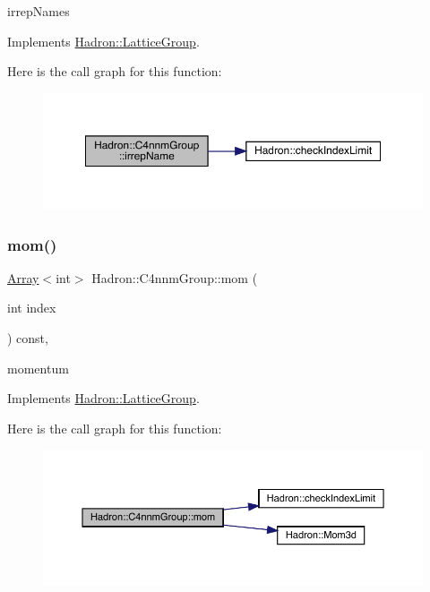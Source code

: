 irrep\+Names 

Implements \mbox{\hyperlink{structHadron_1_1LatticeGroup_a4bc5620218c2a73157e19bc4451fe746}{Hadron\+::\+Lattice\+Group}}.

Here is the call graph for this function\+:
\nopagebreak
\begin{figure}[H]
\begin{center}
\leavevmode
\includegraphics[width=350pt]{d1/dba/structHadron_1_1C4nnmGroup_ac2b3ee6989ddbd93bc63c46ac9626997_cgraph}
\end{center}
\end{figure}
\mbox{\label{structHadron_1_1C4nnmGroup_a7553c7f91a8dc310b37b7b5da32e98f6}} 
\subsubsection{\texorpdfstring{mom()}{mom()}\hspace{0.1cm}{\footnotesize\ttfamily [1/2]}}
{\footnotesize\ttfamily \mbox{\hyperlink{classXMLArray_1_1Array}{Array}}$<$int$>$ Hadron\+::\+C4nnm\+Group\+::mom (\begin{DoxyParamCaption}\item[{int}]{index }\end{DoxyParamCaption}) const\hspace{0.3cm}{\ttfamily [inline]}, {\ttfamily [virtual]}}

momentum 

Implements \mbox{\hyperlink{structHadron_1_1LatticeGroup_ad577b65041dd9a6e84b1f3bd49cb8fce}{Hadron\+::\+Lattice\+Group}}.

Here is the call graph for this function\+:
\nopagebreak
\begin{figure}[H]
\begin{center}
\leavevmode
\includegraphics[width=350pt]{d1/dba/structHadron_1_1C4nnmGroup_a7553c7f91a8dc310b37b7b5da32e98f6_cgraph}
\end{center}
\end{figure}
\mbox{\label{structHadron_1_1C4nnmGroup_a7553c7f91a8dc310b37b7b5da32e98f6}} 
